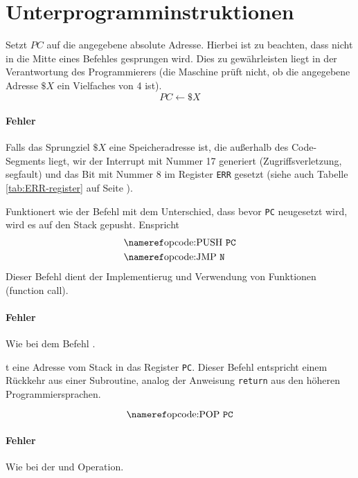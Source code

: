 \section{Unterprogramminstruktionen}

Setzt $PC$ auf die angegebene absolute Adresse. Hierbei ist zu beachten,  dass
nicht in die Mitte eines Befehles gesprungen wird. Dies zu gewährleisten liegt
in der Verantwortung des Programmierers (die Maschine prüft nicht, ob die
angegebene Adresse $\$X$ ein Vielfaches von 4 ist).
\[
    PC \gets \$X
\]

\paragraph{Fehler}
Falls das Sprungziel $\$X$ eine Speicheradresse ist, die außerhalb des
Code-Segments liegt, wir der Interrupt mit Nummer 17 generiert
(Zugriffsverletzung, segfault) und das Bit mit Nummer 8 im Register \texttt{ERR}
gesetzt (siehe auch Tabelle \ref{tab:ERR-register} auf Seite
\pageref{tab:ERR-register}).


Funktionert wie der Befehl  mit dem Unterschied, dass bevor
\texttt{PC} neugesetzt wird, wird es auf den Stack gepusht. Enspricht
\begin{align*}
 & \text{\opref{PUSH} \texttt{PC}} \\
 & \text{\opref{JMP}  \texttt{N}} 
\end{align*}
Dieser Befehl dient der Implementierug und Verwendung von Funktionen (function
call).

\paragraph{Fehler}
Wie bei dem Befehl .


t eine Adresse vom Stack in das Register \texttt{PC}. Dieser Befehl
entspricht einem Rückkehr aus einer Subroutine, analog der Anweisung
\texttt{return} aus den höheren Programmiersprachen.

\[
  \text{\opref{POP} \texttt{PC}} 
\]

\paragraph{Fehler}
Wie bei der  und  Operation.



